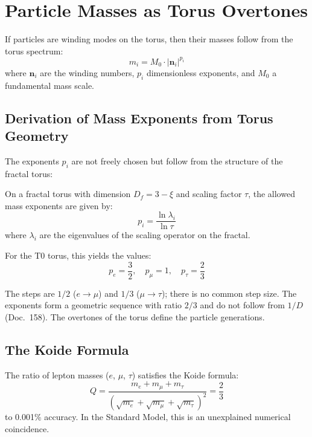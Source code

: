 	\section{Particle Masses as Torus Overtones}
	
	If particles are winding modes on the torus, then their masses follow from the torus spectrum:
	\begin{equation}
		m_i = M_0 \cdot |\mathbf{n}_i|^{p_i}
		\label{eq:mass-scaling}
	\end{equation}
	where $\mathbf{n}_i$ are the winding numbers, $p_i$ dimensionless exponents, and $M_0$ a fundamental mass scale.
	
	\subsection{Derivation of Mass Exponents from Torus Geometry}
	
	The exponents $p_i$ are not freely chosen but follow from the structure of the fractal torus:
	
	\begin{keypoint}
		On a fractal torus with dimension $D_f = 3 - \xi$ and scaling factor $\tau$, the allowed mass exponents are given by:
		\begin{equation}
			p_i = \frac{\ln \lambda_i}{\ln \tau}
		\end{equation}
		where $\lambda_i$ are the eigenvalues of the scaling operator on the fractal.
	\end{keypoint}
	
	For the T0 torus, this yields the values:
	\begin{equation}
		p_e = \frac{3}{2}, \quad p_\mu = 1, \quad p_\tau = \frac{2}{3}
	\end{equation}
	
	The steps are $1/2$ ($e \to \mu$) and $1/3$ ($\mu \to \tau$); there is no common step size. The exponents form a geometric sequence with ratio $2/3$ and do not follow from $1/D$ (Doc.~158). The overtones of the torus define the particle generations.
	
	\subsection{The Koide Formula}
	
	The ratio of lepton masses ($e$, $\mu$, $\tau$) satisfies the Koide formula:
	\begin{equation}
		Q = \frac{m_e + m_\mu + m_\tau}{\left(\sqrt{m_e} + \sqrt{m_\mu} + \sqrt{m_\tau}\right)^2} = \frac{2}{3}
		\label{eq:koide}
	\end{equation}
	to 0.001\% accuracy. In the Standard Model, this is an unexplained numerical coincidence.
	
